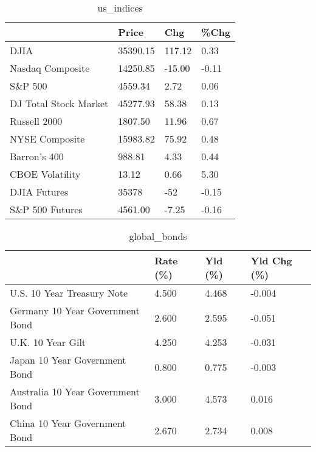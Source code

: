 \documentclass{article}%
\begin{document}
%


\begin{table}[htbp]%
\caption{us\_indices}%
\centering%
\begin{adjustbox}{width=1\textwidth}%
\begin{tabular}{llll}
\toprule
                      &    Price &    Chg &  \%Chg \\
\midrule
                 DJIA & 35390.15 & 117.12 &  0.33 \\
     Nasdaq Composite & 14250.85 & -15.00 & -0.11 \\
              S\&P 500 &  4559.34 &   2.72 &  0.06 \\
DJ Total Stock Market & 45277.93 &  58.38 &  0.13 \\
         Russell 2000 &  1807.50 &  11.96 &  0.67 \\
       NYSE Composite & 15983.82 &  75.92 &  0.48 \\
         Barron's 400 &   988.81 &   4.33 &  0.44 \\
      CBOE Volatility &    13.12 &   0.66 &  5.30 \\
         DJIA Futures &    35378 &    -52 & -0.15 \\
      S\&P 500 Futures &  4561.00 &  -7.25 & -0.16 \\
\bottomrule
\end{tabular}
%
\end{adjustbox}%
\end{table}

%


\begin{table}[htbp]%
\caption{global\_bonds}%
\centering%
\begin{adjustbox}{width=1\textwidth}%
\begin{tabular}{llll}
\toprule
                                  & Rate (\%) & Yld (\%) & Yld Chg (\%) \\
\midrule
       U.S. 10 Year Treasury Note &    4.500 &   4.468 &      -0.004 \\
  Germany 10 Year Government Bond &    2.600 &   2.595 &      -0.051 \\
                U.K. 10 Year Gilt &    4.250 &   4.253 &      -0.031 \\
    Japan 10 Year Government Bond &    0.800 &   0.775 &      -0.003 \\
Australia 10 Year Government Bond &    3.000 &   4.573 &       0.016 \\
    China 10 Year Government Bond &    2.670 &   2.734 &       0.008 \\
\bottomrule
\end{tabular}
%
\end{adjustbox}%
\end{table}
\end{document}
